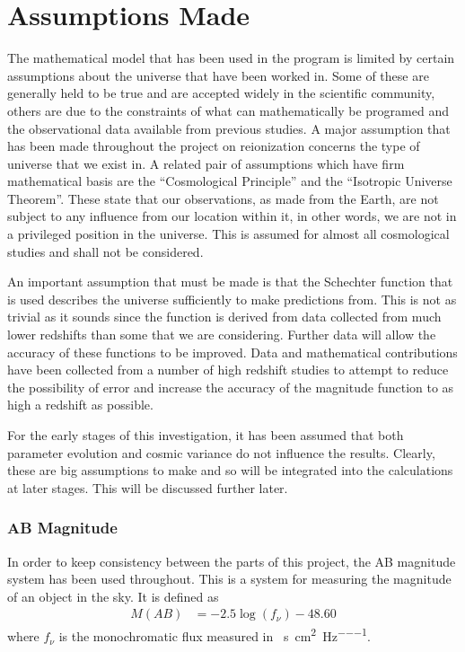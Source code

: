 
\section{Assumptions Made} %
\label{sec:assumptions_made}
	The mathematical model that has been used in the program is limited by certain assumptions about the universe that have been worked in. Some of these are generally held to be true and are accepted widely in the scientific community, others are due to the constraints of what can mathematically be programed and the observational data available from previous studies. A major assumption that has been made throughout the project on reionization concerns the type of universe that we exist in. A related pair of assumptions which have firm mathematical basis are the ``Cosmological Principle'' and the ``Isotropic Universe Theorem''. These state that our observations, as made from the Earth, are not subject to any influence from our location within it, in other words, we are not in a privileged position in the universe. This is assumed for almost all cosmological studies and shall not be considered.

	An important assumption that must be made is that the Schechter function that is used describes the universe sufficiently to make predictions from. This is not as trivial as it sounds since the function is derived from data collected from much lower redshifts than some that we are considering. Further data will allow the accuracy of these functions to be improved. Data and mathematical contributions have been collected from a number of high redshift studies to attempt to reduce the possibility of error and increase the accuracy of the magnitude function to as high a redshift as possible.

	For the early stages of this investigation, it has  been assumed that both parameter evolution and cosmic variance do not influence the results. Clearly, these are big assumptions to make and so will be integrated into the calculations at later stages. This will be discussed further later.

	\subsubsection{AB Magnitude} %
	\label{ssub:ab_magnitude}
		In order to keep consistency between the parts of this project, the AB magnitude system has been used throughout. This is a system for measuring the magnitude of an object in the sky. It is defined as
		\begin{align}
			M(AB) &= -2.5\log(f_\nu) -48.60 \label{eq:ab_magnitude}
		\end{align}
		where $f_\nu$ is the monochromatic flux measured in \si{\erg\per\second\per\square\centi\metre\per\hertz}.

